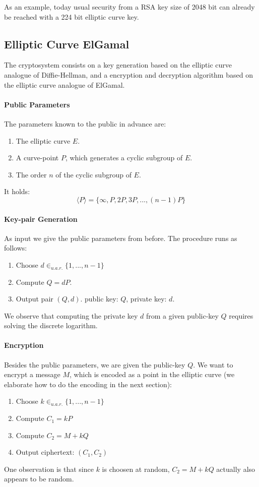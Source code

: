 \documentclass[11pt,english]{article}
\begin{document}
As an example, today usual security from a RSA key size of 2048 bit can already be reached with a 224 bit elliptic curve key.

\subsection{Elliptic Curve ElGamal}
The cryptosystem consists on a key generation based on the elliptic curve analogue of Diffie-Hellman, and a encryption and decryption algorithm based on the elliptic curve analogue of ElGamal.

\paragraph{Public Parameters} The parameters known to the public in advance are:
\begin{enumerate}
 \item The elliptic curve $E$.
 \item A curve-point $P$, which generates a cyclic subgroup of $E$.
 \item The order $n$ of the cyclic subgroup of $E$.
\end{enumerate}
It holds:
\begin{displaymath}
 \langle P\rangle=\{\infty,P,2P,3P,...,(n-1)P\}
\end{displaymath}


\paragraph{Key-pair Generation}
As input we give the public parameters from before. The procedure runs as follows:
\begin{enumerate}
 \item Choose $d\in_{u.a.r.}\{1,...,n-1\}$
 \item Compute $Q=dP$.
 \item Output pair $(Q,d)$. public key: $Q$, private key: $d$.
\end{enumerate}
We observe that computing the private key $d$ from a given public-key $Q$ requires solving the discrete logarithm.

\paragraph{Encryption}
Besides the public parameters, we are given the public-key $Q$. We want to encrypt a message $M$, which is encoded as a point in the elliptic curve (we elaborate how to do the encoding in the next section):
\begin{enumerate}
\item Choose $k\in_{u.a.r.}\{1,...,n-1\}$
\item Compute $C_1=kP$
\item Compute $C_2=M+kQ$
\item Output ciphertext: $(C_1,C_2)$
\end{enumerate}
One observation is that since $k$ is choosen at random, $C_2=M+kQ$ actually also appears to be random.
\end{document}
